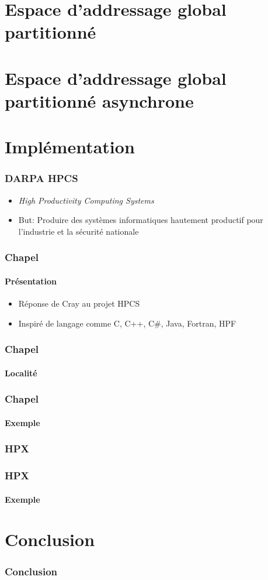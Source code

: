 \documentclass{beamer}
\begin{document}
\section{Espace d'addressage global partitionné}
\begin{frame}
\frametitle{}
\end{frame}

\section{Espace d'addressage global partitionné asynchrone}
\begin{frame}
\frametitle{}
\end{frame}

\section{Implémentation}
\begin{frame}
\frametitle{DARPA HPCS}
\begin{itemize}
\item \textit{High Productivity Computing Systems}
\item But: Produire des systèmes informatiques hautement productif pour l'industrie et la sécurité nationale
\end{itemize}
\end{frame}

\begin{frame}
\frametitle{Chapel}
\framesubtitle{Présentation}
\begin{itemize}
\item Réponse de Cray au projet HPCS
\item Inspiré de langage comme C, C++, C\#, Java, Fortran, HPF
\end{itemize}
\end{frame}

\begin{frame}
\frametitle{Chapel}
\framesubtitle{Localité}
\end{frame}

\begin{frame}
\frametitle{Chapel}
\framesubtitle{Exemple}
\end{frame}

\begin{frame}
\frametitle{HPX}
\end{frame}

\begin{frame}
\frametitle{HPX}
\framesubtitle{Exemple}
\end{frame}

\section{Conclusion}
\begin{frame}
\frametitle{Conclusion}
\end{frame}
\end{document}
